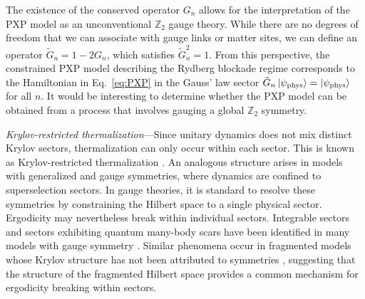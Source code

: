 \documentclass[
 reprint,
 amsmath,amssymb,
 aps,floatfix,prl,superscriptaddress
]{revtex4-2}
\newcounter{paranum}
\renewcommand{\theparanum}{\Roman{paranum}} %
\newcommand{\pnum}[1]{%
  \textit{#1}---}
\begin{document}
The existence of the conserved operator $G_n$ allows for the interpretation of the PXP model as an unconventional $\mathbb{Z}_2$ gauge theory. While there are no degrees of freedom that we can associate with gauge links or matter sites, we can define an operator $\tilde{G}_n = 1-2G_n$, which satisfies $\tilde{G}_n^2 = 1$. From this perspective, the constrained PXP model describing the Rydberg blockade regime corresponds to the Hamiltonian in Eq.~\eqref{eq:PXP} in the Gauss' law sector $\tilde{G}_n \ket{\psi_\mathrm{phys}} = \ket{\psi_\mathrm{phys}}$ for all $n$. It would be interesting to determine whether the PXP model can be obtained from a process that involves gauging a global $\mathbb{Z}_2$ symmetry. 


\pnum{Krylov-restricted thermalization}Since unitary dynamics does not mix distinct Krylov sectors, thermalization can only occur within each sector. This is known as Krylov-restricted thermalization \cite{Moudgalya:2019vlp,moudgalya_quantum_2021}. An analogous structure arises in models with generalized and gauge symmetries, where dynamics are confined to superselection sectors. In gauge theories, it is standard to resolve these symmetries by constraining the Hilbert space to a single physical sector. 
Ergodicity may nevertheless break within individual sectors. Integrable sectors \cite{HerzogArbeitman2019} and sectors exhibiting quantum many-body scars have been identified in many models with gauge symmetry \cite{Banerjee:2020tgz,biswasScarsProtectedZero2022,Desaules:2022kse,wangInterrelatedThermalizationQuantum2023,Budde:2024rql,sauSublatticeScarsTwodimensional2024,Halimeh:2025vvp,hartseStabilizerScars2025,calajoQuantumManybodyScarring2025,miaoExactQuantumManyBody2025,guptaExactStabilizerScars2026,Budde:2026udh}. Similar phenomena occur in fragmented models whose Krylov structure has not been attributed to symmetries \cite{moudgalya_quantum_2021, Ganguli2025}, suggesting that the structure of the fragmented Hilbert space provides a common mechanism for ergodicity breaking within sectors.
\end{document}
